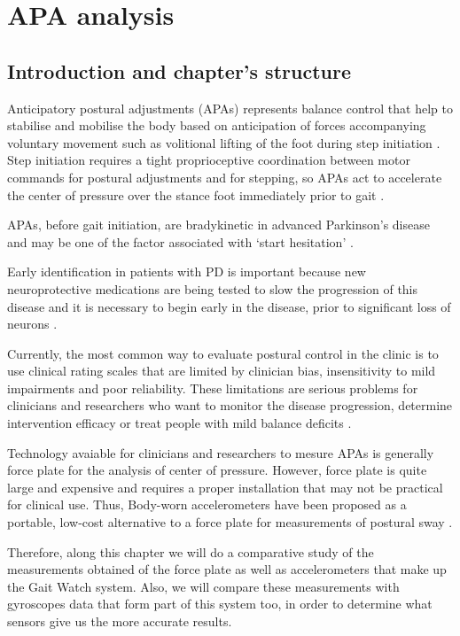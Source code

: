 \section{APA analysis}
\subsection{Introduction and chapter's structure}

Anticipatory postural adjustments (APAs)  represents balance control that help to stabilise and mobilise the body based on anticipation of forces accompanying voluntary movement such as volitional lifting of the foot during step initiation \cite{Mancini2010}. Step initiation requires a tight proprioceptive coordination between motor commands for postural adjustments and for stepping, so APAs act to accelerate the center of pressure over the stance foot immediately prior to gait \cite{Mancini2009}.

APAs, before gait initiation, are bradykinetic in advanced Parkinson’s disease and may be one of the factor associated with ‘start hesitation’ \cite{Mancini2009}.

Early identification in patients with PD is important because new neuroprotective medications are being tested to slow the progression of this disease and it is necessary to begin early in the disease, prior to significant loss of neurons \cite{Mancini2012}. 

Currently, the most common way to evaluate postural control in the clinic is to use clinical rating scales that are limited by clinician bias, insensitivity to mild impairments and poor reliability. These limitations are serious problems for clinicians and researchers who want to monitor the disease progression, determine intervention efficacy or treat people with mild balance deficits \cite{Mancini2012} .

Technology avaiable for clinicians and researchers to mesure APAs is generally force plate for the analysis of center of pressure. However, force plate is quite large and expensive and requires a proper installation that may not be practical for clinical use. Thus, Body-worn accelerometers have been proposed as a portable, low-cost alternative to a force plate for measurements of postural sway \cite{Mancini2012} .
 
Therefore, along this chapter we will do a comparative study of the measurements obtained of the force plate as well as accelerometers that make up the Gait Watch system. Also, we will compare these measurements with gyroscopes data that form part of this system too, in order to determine what sensors give us the more accurate results.

